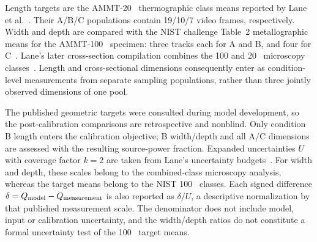 Length targets are the AMMT-20~\us{} thermographic class means reported by Lane et al.~\cite{lane2020}. Their A/B/C populations contain 19/10/7 video frames, respectively. Width and depth are compared with the NIST challenge Table~2 metallographic means for the AMMT-100~\us{} specimen: three tracks each for A and B, and four for C~\cite{nist2018}. Lane's later cross-section compilation combines the 100 and 20~\us{} microscopy classes~\cite{lane2020}. Length and cross-sectional dimensions consequently enter as condition-level measurements from separate sampling populations, rather than three jointly observed dimensions of one pool.

The published geometric targets were consulted during model development, so the post-calibration comparisons are retrospective and nonblind. Only condition B length enters the calibration objective; B width/depth and all A/C dimensions are assessed with the resulting source-power fraction. Expanded uncertainties $U$ with coverage factor $k=2$ are taken from Lane's uncertainty budgets~\cite{lane2020}. For width and depth, these scales belong to the combined-class microscopy analysis, whereas the target means belong to the NIST 100~\us{} classes. Each signed difference $\delta=Q_{\rm model}-Q_{\rm measurement}$ is also reported as $\delta/U$, a descriptive normalization by that published measurement scale. The denominator does not include model, input or calibration uncertainty, and the width/depth ratios do not constitute a formal uncertainty test of the 100~\us{} target means.


